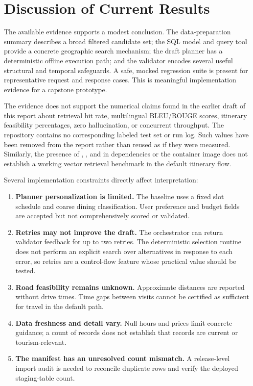 \section{Discussion of Current Results}

The available evidence supports a modest conclusion. The data-preparation summary describes a broad filtered candidate set; the SQL model and query tool provide a concrete geographic search mechanism; the draft planner has a deterministic offline execution path; and the validator encodes several useful structural and temporal safeguards. A safe, mocked regression suite is present for representative request and response cases. This is meaningful implementation evidence for a capstone prototype.

The evidence does not support the numerical claims found in the earlier draft of this report about retrieval hit rate, multilingual BLEU/ROUGE scores, itinerary feasibility percentages, zero hallucination, or concurrent throughput. The repository contains no corresponding labeled test set or run log. Such values have been removed from the report rather than reused as if they were measured. Similarly, the presence of , , and  in dependencies or the container image does not establish a working vector retrieval benchmark in the default itinerary flow.

Several implementation constraints directly affect interpretation:
\begin{enumerate}[leftmargin=1.8em,itemsep=3pt]
    \item \textbf{Planner personalization is limited.} The baseline uses a fixed slot schedule and coarse dining classification. User preference and budget fields are accepted but not comprehensively scored or validated.
    \item \textbf{Retries may not improve the draft.} The orchestrator can return validator feedback for up to two retries. The deterministic selection routine does not perform an explicit search over alternatives in response to each error, so retries are a control-flow feature whose practical value should be tested.
    \item \textbf{Road feasibility remains unknown.} Approximate distances are reported without drive times. Time gaps between visits cannot be certified as sufficient for travel in the default path.
    \item \textbf{Data freshness and detail vary.} Null hours and prices limit concrete guidance; a count of records does not establish that records are current or tourism-relevant.
    \item \textbf{The manifest has an unresolved count mismatch.} A release-level import audit is needed to reconcile duplicate rows and verify the deployed staging-table count.
\end{enumerate}

